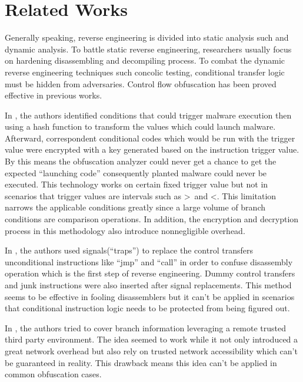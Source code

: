 \documentclass[lnicst]{svmultln}
\begin{document}
%
\section{Related Works}
%
Generally speaking, reverse engineering is divided into static analysis such and dynamic analysis. To battle static reverse engineering, researchers usually focus on hardening disassembling and decompiling process. To combat the dynamic reverse engineering techniques such concolic testing, conditional transfer logic must be hidden from adversaries. Control flow obfuscation has been proved effective in previous works.

In \cite{Sharif}, the authors identified conditions that could trigger malware execution then using a hash function to transform the values which could launch malware. Afterward, correspondent conditional codes which would be run with the trigger value were encrypted with a key generated based on the instruction trigger value.
By this means the obfuscation analyzer could never get a chance to get the expected ``launching code'' consequently planted malware could never be executed. This technology works on certain fixed trigger value but not in scenarios that trigger values are intervals such as \textgreater \   and  \textless. This limitation narrows the applicable conditions greatly since a large volume of branch conditions are comparison operations. In addition, the encryption and decryption process in this methodology also introduce nonnegligible overhead.

In \cite{Popov}, the authors used signals(``traps'') to replace the control transfers unconditional instructions like ``jmp'' and ``call'' in order to confuse disassembly operation which is the first step of reverse engineering. Dummy control transfers and junk instructions were also inserted after signal replacements. This method seems to be effective in fooling disassemblers but it can't be applied in scenarios that conditional instruction logic needs to be protected from being figured out.

In \cite{Zhi}, the authors tried to cover branch information leveraging a remote trusted third party environment. The idea seemed to work while it not only introduced a great network overhead but also rely on trusted network accessibility which can't be guaranteed in reality. This drawback means this idea can't be applied in common obfuscation cases.
\end{document}
